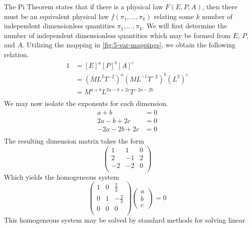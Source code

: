 \documentclass[12pt]{article}
\begin{document}
  The Pi Theorem states that if there is a physical law $F(E, P, A)$, then there
  must be an equivalent physical law $f(\pi_1, \ldots, \pi_k)$ relating some $k$
  number of independent dimensionless quantities $\pi_1,\ldots,\pi_k$. We will
  first determine the number of independent dimensionless quantities which may
  be formed from $E$, $P$, and $A$. Utilizing the mapping in
  \cref{fig:5-var-mappings}, we obtain the following relation.
  \begin{equation*}
    \begin{aligned}
      1 &= {[E]}^a{[P]}^b{[A]}^c \\
      &= {(ML^2T^{-2})}^a{(ML^{-1}T^{-2})}^b{(L^2)}^c \\
      &= M^{a+b}L^{2a-b+2c}T^{-2a-2b} \\
    \end{aligned}
  \end{equation*}
  We may now isolate the exponents for each dimension.
  \begin{equation*}
    \begin{aligned}
      a + b &= 0 \\
      2a - b + 2c &= 0 \\
      -2a - 2b + 2c &= 0 \\
    \end{aligned}
  \end{equation*}
  The resulting dimension matrix takes the form
  \begin{equation*}
    \begin{pmatrix}
      1 & 1 & 0 \\
      2 & -1 & 2 \\
      -2 & -2 & 0 \\
    \end{pmatrix}
  \end{equation*}
  Which yields the homogeneous system
  \begin{equation*}
    \begin{pmatrix}
      1 & 0 & \frac{2}{3} \\
      0 & 1 & -\frac{2}{3} \\
      0 & 0 & 0 \\
    \end{pmatrix}
    \begin{pmatrix}
      a \\ b \\ c \
    \end{pmatrix} = 0
  \end{equation*}
  This homogeneous system may be solved by standard methods for solving linear
\end{document}
